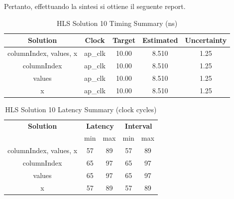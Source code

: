 Pertanto, effettuando la sintesi si ottiene il seguente report.

\begin{table}[H]
	\centering
	\begin{tabular}{|c|c|c|c|c|}
		\hline
		\textbf{Solution} & \textbf{Clock} & \textbf{Target} & \textbf{Estimated} & \textbf{Uncertainty} \\
		\hline
		columnIndex, values, x & ap\_clk & 10.00 & 8.510 & 1.25 \\
		\hline
		columnIndex & ap\_clk & 10.00 & 8.510 & 1.25 \\
		\hline
		values & ap\_clk & 10.00 & 8.510 & 1.25 \\
		\hline
		x & ap\_clk & 10.00 & 8.510 & 1.25 \\
		\hline
	\end{tabular}
	\caption{HLS Solution 10 Timing Summary (ns)}
	\label{tab:hls-solution-10-timing-summary}
\end{table}

\begin{table}[H]
	\centering
	\begin{tabular}{|c|c|c|c|c|}
		\hline
		\multicolumn{1}{|c|}{\textbf{Solution}} & \multicolumn{2}{|c|}{\textbf{Latency}} & \multicolumn{2}{|c|}{\textbf{Interval}} \\
		& min & max & min & max \\
		\hline
		columnIndex, values, x & 57 & 89 & 57 & 89 \\
		\hline
		columnIndex & 65 & 97 & 65 & 97 \\
		\hline
		values & 65 & 97 & 65 & 97 \\
		\hline
		x & 57 & 89 & 57 & 89 \\
		\hline
	\end{tabular}
	\caption{HLS Solution 10 Latency Summary (clock cycles)}
	\label{tab:hls-solution-10-latency-summary}
\end{table}

